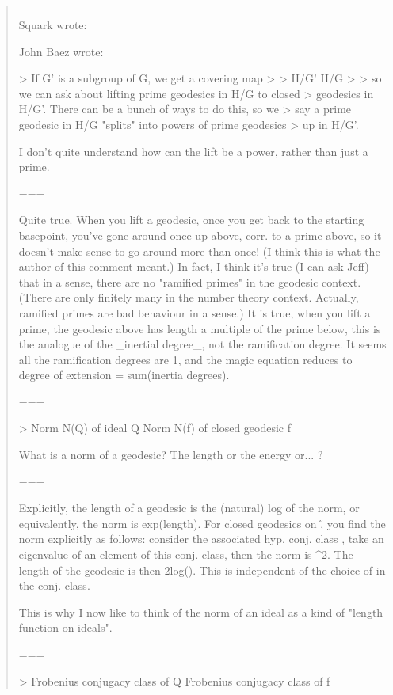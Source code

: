 \begin{quote}

$$


Squark wrote:

  John Baez wrote:

   > If G' is a subgroup of G, we get a covering map
   >
   > H/G' \to  H/G
   >
   > so we can ask about lifting prime geodesics in H/G to closed
   > geodesics in H/G'.   There can be a bunch of ways to do this, so we 
   > say a prime geodesic in H/G "splits" into powers of prime geodesics 
   > up in H/G'.

   I don't quite understand how can the lift be a power, rather than just
   a prime.

===

Quite true. When you lift a geodesic, once you get back to the starting
basepoint, you've gone around once up above, corr. to a prime above, so
it doesn't make sense to go around more than once! (I think this is what
the author of this comment meant.) In fact, I think it's true (I can ask
Jeff) that in a sense, there are no "ramified primes" in the geodesic
context. (There are only finitely many in the number theory context.
Actually, ramified primes are bad behaviour in a sense.) It is true,
when you lift a prime, the geodesic above has length a multiple of the
prime below, this is the analogue of the _inertial degree_, not the
ramification degree. It seems all the ramification degrees are 1, and
the magic equation reduces to degree of extension = sum(inertia
degrees).

===

   > Norm N(Q) of ideal Q             Norm N(f) of closed geodesic f

   What is a norm of a geodesic? The length or the energy or... ?

===

Explicitly, the length of a geodesic is the (natural) log of the norm,
or equivalently, the norm is exp(length). For closed geodesics on
\Gamma \H, you find the norm explicitly as follows: consider the
associated hyp. conj. class {\gamma }, take an eigenvalue \epsilon  of an
element of this conj. class, then the norm is \epsilon ^2. The length of
the geodesic is then 2log(\epsilon ). This is independent of the choice of
\gamma  in the conj. class.

This is why I now like to think of the norm of an ideal as a kind of
"length function on ideals".

===

   > Frobenius conjugacy class of Q   Frobenius conjugacy class of f


\end{quote}
